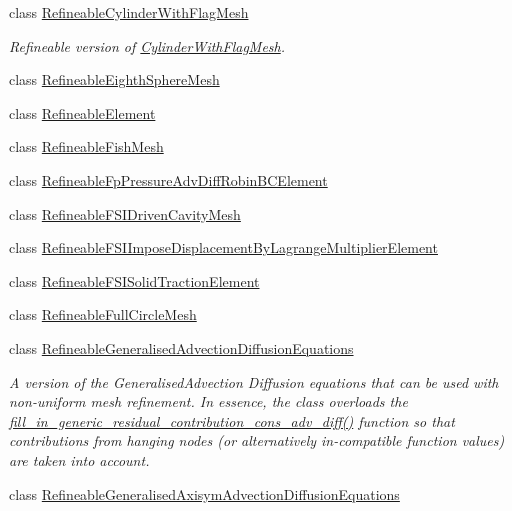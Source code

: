 \begin{DoxyCompactItemize}
class \hyperlink{classoomph_1_1RefineableCylinderWithFlagMesh}{Refineable\+Cylinder\+With\+Flag\+Mesh}
\begin{DoxyCompactList}\small\item\em Refineable version of \hyperlink{classoomph_1_1CylinderWithFlagMesh}{Cylinder\+With\+Flag\+Mesh}. \end{DoxyCompactList}\item 
class \hyperlink{classoomph_1_1RefineableEighthSphereMesh}{Refineable\+Eighth\+Sphere\+Mesh}
\item 
class \hyperlink{classoomph_1_1RefineableElement}{Refineable\+Element}
\item 
class \hyperlink{classoomph_1_1RefineableFishMesh}{Refineable\+Fish\+Mesh}
\item 
class \hyperlink{classoomph_1_1RefineableFpPressureAdvDiffRobinBCElement}{Refineable\+Fp\+Pressure\+Adv\+Diff\+Robin\+B\+C\+Element}
\item 
class \hyperlink{classoomph_1_1RefineableFSIDrivenCavityMesh}{Refineable\+F\+S\+I\+Driven\+Cavity\+Mesh}
\item 
class \hyperlink{classoomph_1_1RefineableFSIImposeDisplacementByLagrangeMultiplierElement}{Refineable\+F\+S\+I\+Impose\+Displacement\+By\+Lagrange\+Multiplier\+Element}
\item 
class \hyperlink{classoomph_1_1RefineableFSISolidTractionElement}{Refineable\+F\+S\+I\+Solid\+Traction\+Element}
\item 
class \hyperlink{classoomph_1_1RefineableFullCircleMesh}{Refineable\+Full\+Circle\+Mesh}
\item 
class \hyperlink{classoomph_1_1RefineableGeneralisedAdvectionDiffusionEquations}{Refineable\+Generalised\+Advection\+Diffusion\+Equations}
\begin{DoxyCompactList}\small\item\em A version of the Generalised\+Advection Diffusion equations that can be used with non-\/uniform mesh refinement. In essence, the class overloads the \hyperlink{classoomph_1_1RefineableGeneralisedAdvectionDiffusionEquations_abd0535533c7133651ac18ad8e025f139}{fill\+\_\+in\+\_\+generic\+\_\+residual\+\_\+contribution\+\_\+cons\+\_\+adv\+\_\+diff()} function so that contributions from hanging nodes (or alternatively in-\/compatible function values) are taken into account. \end{DoxyCompactList}\item 
class \hyperlink{classoomph_1_1RefineableGeneralisedAxisymAdvectionDiffusionEquations}{Refineable\+Generalised\+Axisym\+Advection\+Diffusion\+Equations}

\end{DoxyCompactItemize}
